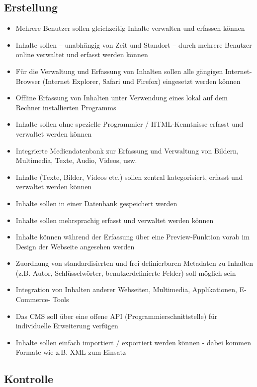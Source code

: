 \subsection{Erstellung}
\begin{itemize}
\item
Mehrere Benutzer sollen gleichzeitig Inhalte verwalten und erfassen können
\item
Inhalte sollen – unabhängig von Zeit und Standort – durch mehrere Benutzer online verwaltet und erfasst werden können
\item
Für die Verwaltung und Erfassung von Inhalten sollen alle gängigen Internet-Browser (Internet Explorer, Safari und Firefox) eingesetzt werden können
\item
Offline Erfassung von Inhalten unter Verwendung eines lokal auf dem Rechner installierten Programms
\item
Inhalte sollen ohne spezielle Programmier / HTML-Kenntnisse erfasst und verwaltet werden können
\item
Integrierte Mediendatenbank zur Erfassung und Verwaltung von Bildern, Multimedia, Texte, Audio, Videos, usw.
\item
Inhalte (Texte, Bilder, Videos etc.) sollen zentral kategorisiert, erfasst und verwaltet werden können
\item
Inhalte sollen in einer Datenbank gespeichert werden
\item
Inhalte sollen mehrsprachig erfasst und verwaltet werden können
\item
Inhalte können während der Erfassung über eine Preview-Funktion vorab im Design der Webseite angesehen werden
\item
Zuordnung von standardisierten und frei definierbaren Metadaten zu Inhalten (z.B. Autor, Schlüsselwörter, benutzerdefinierte Felder) soll möglich sein
\item
Integration von Inhalten anderer Webseiten, Multimedia, Applikationen, E-Commerce- Tools
\item
Das CMS soll über eine offene API (Programmierschnittstelle) für individuelle Erweiterung verfügen
\item
Inhalte sollen einfach importiert / exportiert werden können - dabei kommen Formate wie z.B. XML zum Einsatz
\end{itemize}




\subsection{Kontrolle}


